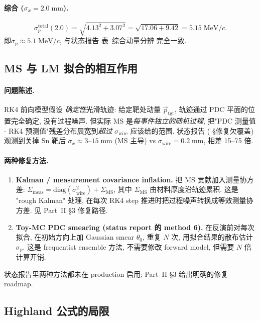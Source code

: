\paragraph{综合 ($\sigma_x = 2.0\;\mathrm{mm}$).}
\begin{equation}
  \sigma_p^\mathrm{total}(2.0) = \sqrt{4.13^2 + 3.07^2}
  = \sqrt{17.06 + 9.42} = 5.15\;\mathrm{MeV}/c.
\end{equation}
即\textbf{$\sigma_p \approx 5.1\;\mathrm{MeV}/c$}, 与状态报告 表~综合动量分辨 完全一致.

\subsection{MS 与 LM 拟合的相互作用}

\paragraph{问题陈述.} RK4 前向模型假设 \emph{确定性}光滑轨迹: 给定靶处动量 $\vec p_\mathrm{tgt}$, 轨迹通过 PDC 平面的位置完全确定, 没有过程噪声. 但实际 MS 是\emph{每事件独立的随机过程}, 把"PDC 测量值 - RK4 预测值"残差分布展宽到\emph{超过} $\sigma_\mathrm{wire}$ 应该给的范围. 状态报告 (\StatusReport{} §修复欠覆盖) 观测到关掉 Sn 靶后 $\sigma_x \approx 3$--$15\;\mathrm{mm}$ (MS 主导) vs $\sigma_\mathrm{wire} = 0.2\;\mathrm{mm}$, 相差 15--75 倍.

\paragraph{两种修复方法.}
\begin{enumerate}[nosep, leftmargin=2em]
  \item \textbf{Kalman / measurement covariance inflation.} 把 MS 贡献加入测量协方差: $\Sigma_\mathrm{meas} = \mathrm{diag}(\sigma_\mathrm{wire}^2) + \Sigma_\mathrm{MS}$, 其中 $\Sigma_\mathrm{MS}$ 由材料厚度沿轨迹累积. 这是 "rough Kalman" 处理, 在每次 RK4 step 推进时把过程噪声转换成等效测量协方差. 见 Part~II §3 修复路径.
  \item \textbf{Toy-MC PDC smearing (status report 的 method 6).} 在反演前对每次拟合, 在初始方向上加 Gaussian smear $\theta_0$, 重复 $N$ 次, 用拟合结果的散布估计 $\sigma_p$. 这是 frequentist ensemble 方法, 不需要修改 forward model, 但需要 $N$ 倍计算开销.
\end{enumerate}
状态报告里两种方法都未在 production 启用; Part~II §3 给出明确的修复 roadmap.

\subsection{Highland 公式的局限}


